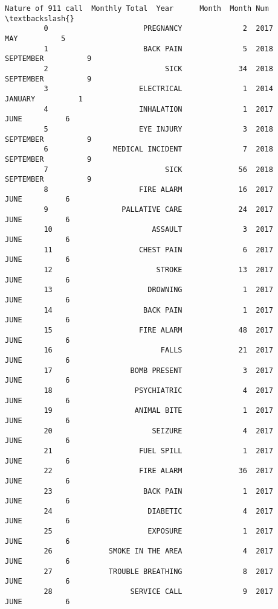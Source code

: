 \documentclass[11pt]{article}
\begin{document}
\begin{Verbatim}[commandchars=\\\{\}]
                       Nature of 911 call  Monthly Total  Year      Month  Month Num  \textbackslash{}
         0                      PREGNANCY              2  2017        MAY          5   
         1                      BACK PAIN              5  2018  SEPTEMBER          9   
         2                           SICK             34  2018  SEPTEMBER          9   
         3                     ELECTRICAL              1  2014    JANUARY          1   
         4                     INHALATION              1  2017       JUNE          6   
         5                     EYE INJURY              3  2018  SEPTEMBER          9   
         6               MEDICAL INCIDENT              7  2018  SEPTEMBER          9   
         7                           SICK             56  2018  SEPTEMBER          9   
         8                     FIRE ALARM             16  2017       JUNE          6   
         9                 PALLATIVE CARE             24  2017       JUNE          6   
         10                       ASSAULT              3  2017       JUNE          6   
         11                    CHEST PAIN              6  2017       JUNE          6   
         12                        STROKE             13  2017       JUNE          6   
         13                      DROWNING              1  2017       JUNE          6   
         14                     BACK PAIN              1  2017       JUNE          6   
         15                    FIRE ALARM             48  2017       JUNE          6   
         16                         FALLS             21  2017       JUNE          6   
         17                  BOMB PRESENT              3  2017       JUNE          6   
         18                   PSYCHIATRIC              4  2017       JUNE          6   
         19                   ANIMAL BITE              1  2017       JUNE          6   
         20                       SEIZURE              4  2017       JUNE          6   
         21                    FUEL SPILL              1  2017       JUNE          6   
         22                    FIRE ALARM             36  2017       JUNE          6   
         23                     BACK PAIN              1  2017       JUNE          6   
         24                      DIABETIC              4  2017       JUNE          6   
         25                      EXPOSURE              1  2017       JUNE          6   
         26             SMOKE IN THE AREA              4  2017       JUNE          6   
         27             TROUBLE BREATHING              8  2017       JUNE          6   
         28                  SERVICE CALL              9  2017       JUNE          6   

\end{Verbatim}
\end{document}
